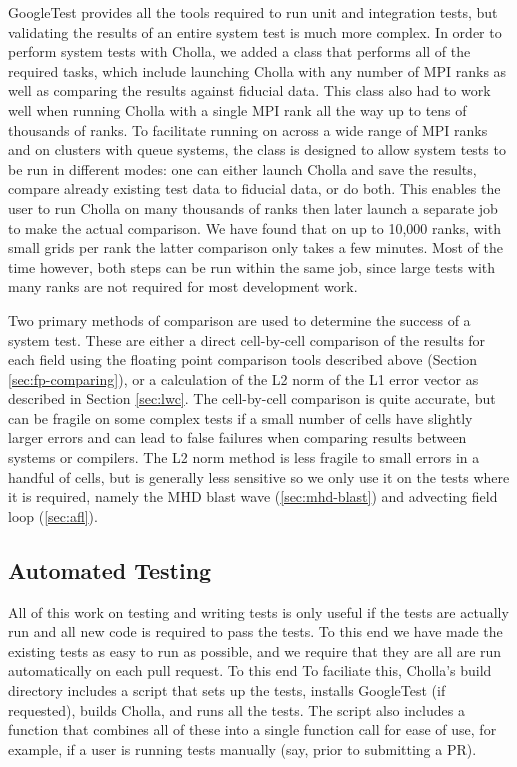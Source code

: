GoogleTest provides all the tools required to run unit and integration tests, but validating the results of an entire system test is much more complex. In order to perform system tests with Cholla, we added a class that performs all of the required tasks, which include launching Cholla with any number of MPI ranks as well as comparing the results against fiducial data. This class also had to work well when running Cholla with a single MPI rank all the way up to tens of thousands of ranks. To facilitate running on across a wide range of MPI ranks and on clusters with queue systems, the class is designed to allow system tests to be run in different modes: one can either launch Cholla and save the results, compare already existing test data to fiducial data, or do both. This enables the user to run Cholla on many thousands of ranks then later launch a separate job to make the actual comparison. We have found that on up to 10,000 ranks, with small grids per rank the latter comparison only takes a few minutes. Most of the time however, both steps can be run within the same job, since large tests with many ranks are not required for most development work.

Two primary methods of comparison are used to determine the success of a system test. These are either a direct cell-by-cell comparison of the results for each field using the floating point comparison tools described above (Section \ref{sec:fp-comparing}), or a calculation of the L2 norm of the L1 error vector as described in Section  \ref{sec:lwc}. The cell-by-cell comparison is quite accurate, but can be fragile on some complex tests if a small number of cells have slightly larger errors and can lead to false failures when comparing results between systems or compilers. The L2 norm method is less fragile to small errors in a handful of cells, but is generally less sensitive so we only use it on the tests where it is required, namely the MHD blast wave (\autoref{sec:mhd-blast}) and advecting field loop (\autoref{sec:afl}).

\subsection{Automated Testing}

All of this work on testing and writing tests is only useful if the tests are actually run and all new code is required to pass the tests. To this end we have made the existing tests as easy to run as possible, and we require that they are all are run automatically on each pull request. To this end To faciliate this, Cholla's build directory includes a script that sets up the tests, installs GoogleTest (if requested), builds Cholla, and runs all the tests. The script also includes a function that combines all of these into a single function call for ease of use, for example, if a user is running tests manually (say, prior to submitting a PR). 


